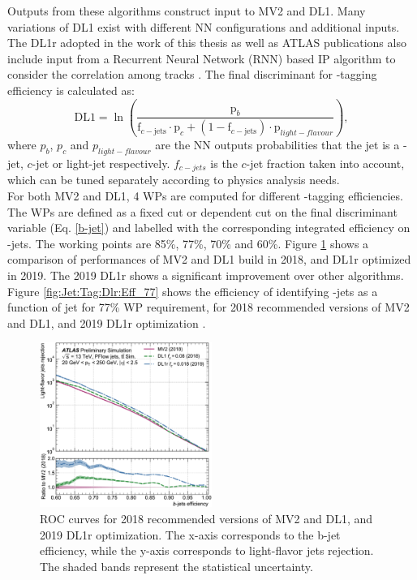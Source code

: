 Outputs from these algorithms construct input to MV2 and DL1. Many variations of DL1 exist with different NN configurations and additional inputs. The DL1r adopted in the work of this thesis as well as ATLAS publications also include input from a Recurrent Neural Network (RNN) based IP algorithm to consider the correlation among tracks \cite{DL1r}. The final discriminant for \bq-tagging efficiency is calculated as:
\begin{equation}
    \mathrm{DL} 1=\ln \left(\frac{\mathrm{p}_{b}}{\mathrm{f}_{c-\mathrm{jets}} \cdot \mathrm{p}_{c}+\left(1-\mathrm{f}_{c-\mathrm{jets}}\right) \cdot \mathrm{p}_{light-flavour }}\right),
    \label{b-jet}
\end{equation}
where $p_b$, $p_c$ and $p_{light-flavour}$ are the NN outputs probabilities that the jet is a \bq-jet, $c$-jet or light-jet respectively. $f_{c-jets}$ is the $c$-jet fraction taken into account, which can be tuned separately according to physics analysis needs. \\  
For both MV2 and DL1, 4 WPs are computed for different \bq-tagging efficiencies. The WPs are defined as a fixed cut or \pT dependent cut on the final discriminant variable (Eq. \ref{b-jet}) and labelled with the corresponding integrated efficiency on \bq-jets. The working points are 85\%, 77\%, 70\% and 60\%. Figure \ref{fig:Jet:Tag:Dlr:Eff} shows a comparison of performances of MV2 and DL1 build in 2018, and DL1r optimized in 2019. The 2019 DL1r shows a significant improvement over other algorithms. Figure \ref{fig:Jet:Tag:Dlr:Eff_77} shows the efficiency of identifying \bq-jets as a function of jet \pT for 77\% WP requirement, for 2018 recommended versions of MV2 and DL1, and 2019 DL1r optimization \cite{Btag_Perf}. 
\begin{figure}[htbp]
    \centering
    \includegraphics[width=0.5\textwidth]{Ch4/Img/b_jet_Eff.png}
    \caption{ROC curves for 2018 recommended versions of MV2 and DL1, and 2019 DL1r optimization. The x-axis corresponds to the b-jet efficiency, while the y-axis corresponds to light-flavor jets rejection. The shaded bands represent the statistical uncertainty.}
    \label{fig:Jet:Tag:Dlr:Eff}
\end{figure}

